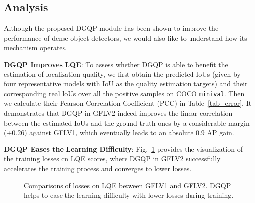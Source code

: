 \documentclass[10pt,twocolumn,letterpaper]{article}
\begin{document}
\begin{figure*}[t]
	\begin{center}
		\setlength{\fboxrule}{0pt}
	\end{center}
	\vspace{-22pt}
	\caption{Visualization of predicted bounding boxes before and after NMS, along with their corresponding predicted LQE scores (only Top-4 scores are plotted for a better view). For many existing approaches \cite{tian2019fcos,zhang2019bridging,li2020generalized}, they fail to produce the highest LQE scores for the best candidates. In contrast, our GFLV2 reliably assigns larger quality scores for those real high-quality ones, thus reducing the risk of mistaken suppression in NMS processing. White: ground-truth bounding boxes; Other colors: predicted bounding boxes.}
	\label{fig_cat}
	\vspace{-10pt}
\end{figure*}

\subsection{Analysis}
Although the proposed DGQP module has been shown to improve the performance of dense object detectors, we would also like to understand how its mechanism operates. 

\noindent \textbf{DGQP Improves LQE}: To assess whether DGQP is able to benefit the estimation of localization quality, we first obtain the predicted IoUs (given by four representative models with IoU as the quality estimation targets) and their corresponding real IoUs over all the positive samples on COCO {\tt minival}. Then we calculate their Pearson Correlation Coefficient (PCC) in Table~\ref{tab_error}. It demonstrates that DGQP in GFLV2 indeed improves the linear correlation between the estimated IoUs and the ground-truth ones by a considerable margin (+0.26) against GFLV1, which eventually leads to an absolute 0.9 AP gain.









\noindent \textbf{DGQP Eases the Learning Difficulty}: Fig.~\ref{fig_loss_iou} provides the visualization of the training losses on LQE scores, where DGQP in GFLV2 successfully accelerates the training process and converges to lower losses.
\begin{figure}[t]
	\vspace{-6pt}
	\begin{center}
		\setlength{\fboxrule}{0pt}
	\end{center}	
	\vspace{-24pt}
	\caption{Comparisons of losses on LQE between GFLV1 and GFLV2. DGQP helps to ease the learning difficulty with lower losses during training.}
	\label{fig_loss_iou}
	\vspace{-12pt}
\end{figure}
\end{document}
